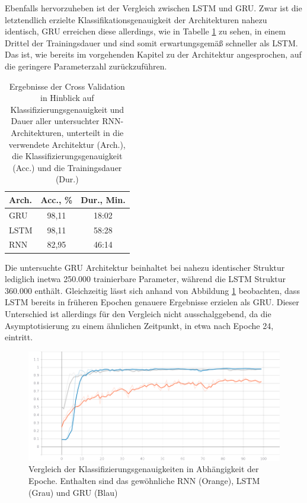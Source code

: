 Ebenfalls hervorzuheben ist der Vergleich zwischen LSTM und GRU. Zwar ist die letztendlich erzielte Klassifikationsgenauigkeit der Architekturen nahezu identisch, GRU erreichen diese allerdings, wie in Tabelle \ref{tab:rnn-comp} zu sehen, in einem Drittel der Trainingsdauer und sind somit erwartungsgemäß schneller als LSTM. Das ist, wie bereits im vorgehenden Kapitel zu der Architektur angesprochen, auf die geringere Parameterzahl zurückzuführen.
\begin{table}[h]
    \centering
    \begin{tabular}{| l | c | c |}
        \hline
        \textbf{Arch.} & \textbf{Acc., \%} & \textbf{Dur., Min.} \\
        \hline
        GRU & 98,11 & 18:02 \\ \hline
        LSTM & 98,11 & 58:28 \\ \hline
        RNN & 82,95 & 46:14 \\

        \hline
    \end{tabular}
    \caption{Ergebnisse der Cross Validation in Hinblick auf Klassifizierungsgenauigkeit und Dauer aller untersuchter RNN-Architekturen, unterteilt in die verwendete Architektur (Arch.), die Klassifizierungsgenauigkeit (Acc.) und die Trainingsdauer (Dur.)}
    \label{tab:rnn-comp}
\end{table}

Die untersuchte GRU Architektur beinhaltet bei nahezu identischer Struktur lediglich inetwa 250.000 trainierbare Parameter, während die LSTM Struktur 360.000 enthält. Gleichzeitig lässt sich anhand von Abbildung \ref{gra:rnn-comp} beobachten, dass LSTM bereits in früheren Epochen genauere Ergebnisse erzielen als GRU. Dieser Unterschied ist allerdings für den Vergleich nicht ausschalggebend, da die Asymptotisierung zu einem ähnlichen Zeitpunkt, in etwa nach Epoche 24, eintritt.

\begin{figure}[h]
    \centering
    \includegraphics[scale=0.3]{grafiken/rnn-comp.png}
    \caption{Vergleich der Klassifizierungsgenauigkeiten in Abhängigkeit der Epoche. Enthalten sind das gewöhnliche RNN (Orange), LSTM (Grau) und GRU (Blau)}
    \label{gra:rnn-comp}
\end{figure}

